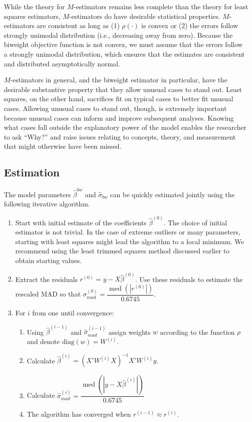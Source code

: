 \documentclass[12pt]{article}
\DeclareMathOperator{\med}{med}
\begin{document}
While the theory for $M$-estimators remains less complete than the theory for least squares estimators, $M$-estimators do have desirable statistical properties. 
$M$-estimators are consistent as long as (1) $\rho(\cdot)$ is convex or (2) the errors follow strongly unimodal distribution (i.e., decreasing away from zero). 
Because the biweight objective function is not convex, we must assume that the errors follow a strongly unimodal distribution, which ensures that the estimates are consistent and distributed asymptotically normal.

$M$-estimators in general, and the biweight estimator in particular, have the desirable substantive property that they allow unusual cases to stand out.
Least squares, on the other hand, sacrifices fit on typical cases to better fit unusual cases. 
Allowing unusual cases to stand out, though, is extremely important because unusual cases can inform and improve subsequent analyses. 
Knowing what cases fall outside the explanatory power of the model enables the researcher to ask ``Why?'' and raise issues relating to concepts, theory, and measurement that might otherwise have been missed.

\subsection*{Estimation}

The model parameters $\hat{\beta}^{bw}$ and $\hat{\sigma}_{bw}$ can be quickly estimated jointly using the following iterative algorithm.
\begin{enumerate}
\item Start with initial estimate of the coefficients $\hat{\beta}^{(0)}$. The choice of initial estimator is not trivial. 
In the case of extreme outliers or many parameters, starting with least squares might lead the algorithm to a local minimum. 
We recommend using the least trimmed squares method discussed earlier to obtain starting values.
\item Extract the residuals $r^{(0)} = y - X\hat{\beta}^{(0)}$. 
Use these residuals to estimate the rescaled MAD so that $\hat{\sigma}^{(0)}_{mad} = \dfrac{\med\left( |r^{(0)}|\right)}{0.6745}$.
\item For $i$ from one until convergence:
        \begin{enumerate}
        \item Using $\hat{\beta}^{(i-1)}$ and $\hat{\sigma}^{(i-1)}_{mad}$ assign weights $w$ according to the function $\rho$ and denote $\text{diag}(w) = W^{(i)}$.
        \item Calculate $\hat{\beta}^{(i)} = (X'W^{(i)}X)^{-1}X'W^{(i)}y$.
        \item Calculate $\hat{\sigma}^{(i)}_{mad} = \dfrac{\med\left( |y - X\hat{\beta}^{(i)}|\right)}{0.6745}$
        \item The algorithm has converged when $r^{(i-1)} \approx r^{(i)}$.
        \end{enumerate}
\end{enumerate}
\end{document}
